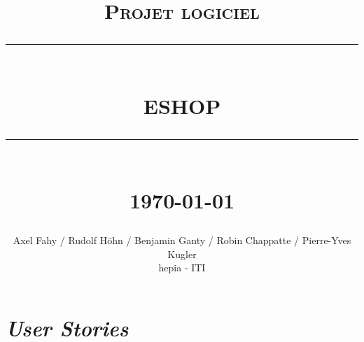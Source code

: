 \documentclass[12pt]{article}
\newcommand{\HRule}[1]{\rule{\linewidth}{#1}}
\begin{document}
\title{ \normalsize \textsc{Projet logiciel}
        \\ [2.0cm]
        \HRule{0.5pt} \\
        \LARGE \textbf{\uppercase{EShop}}
        \HRule{2pt} \\ [0.5cm]
        \normalsize \today \vspace*{5\baselineskip}}

\date{}

\author{
    Axel Fahy / Rudolf Höhn / Benjamin Ganty / Robin Chappatte / Pierre-Yves Kugler\\
    hepia - ITI}

\clearpage
\maketitle
\thispagestyle{empty} %
\newpage
\tableofcontents
\newpage

\sectionfont{\scshape}


\section{\textit{User Stories}}
\end{document}
